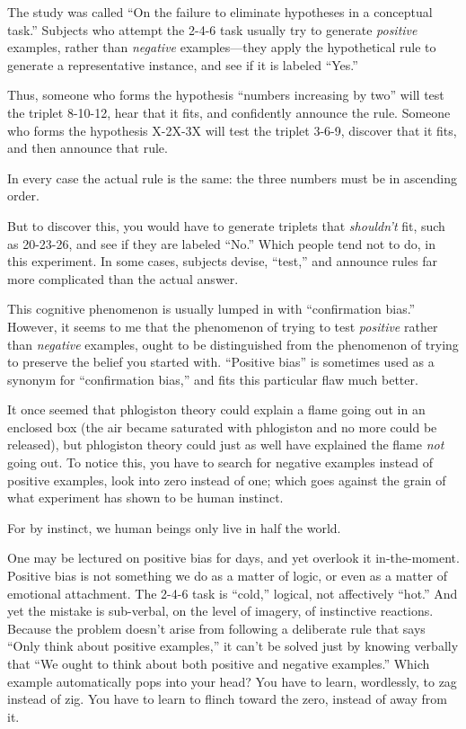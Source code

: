 {
 The study was called ``On the failure to
eliminate hypotheses in a conceptual task.'' Subjects
who attempt the 2-4-6 task usually try to generate \textit{positive}
examples, rather than \textit{negative} examples---they apply the
hypothetical rule to generate a representative instance, and see if it
is labeled ``Yes.''}

{
 Thus, someone who forms the hypothesis ``numbers
increasing by two'' will test the triplet 8-10-12,
hear that it fits, and confidently announce the rule. Someone who forms
the hypothesis X-2X-3X will test the triplet 3-6-9, discover that it
fits, and then announce that rule.}

{
 In every case the actual rule is the same: the three numbers must
be in ascending order.}

{
 But to discover this, you would have to generate triplets that
\textit{shouldn't} fit, such as 20-23-26, and see if
they are labeled ``No.'' Which
people tend not to do, in this experiment. In some cases, subjects
devise, ``test,'' and announce rules
far more complicated than the actual answer.}

{
 This cognitive phenomenon is usually lumped in with
``confirmation bias.'' However, it
seems to me that the phenomenon of trying to test \textit{positive}
rather than \textit{negative} examples, ought to be distinguished from
the phenomenon of trying to preserve the belief you started with.
``Positive bias'' is sometimes used
as a synonym for ``confirmation
bias,'' and fits this particular flaw much better.}

{
 It once seemed that phlogiston theory could explain a flame going
out in an enclosed box (the air became saturated with phlogiston and no
more could be released), but phlogiston theory could just as well have
explained the flame \textit{not} going out. To notice this, you have to
search for negative examples instead of positive examples, look into
zero instead of one; which goes against the grain of what experiment
has shown to be human instinct.}

{
 For by instinct, we human beings only live in half the world.}

{
 One may be lectured on positive bias for days, and yet overlook it
in-the-moment. Positive bias is not something we do as a matter of
logic, or even as a matter of emotional attachment. The 2-4-6 task is
``cold,'' logical, not affectively
``hot.'' And yet the mistake is
sub-verbal, on the level of imagery, of instinctive reactions. Because
the problem doesn't arise from following a deliberate
rule that says ``Only think about positive
examples,'' it can't be solved just
by knowing verbally that ``We ought to think about
both positive and negative examples.'' Which example
automatically pops into your head? You have to learn, wordlessly, to
zag instead of zig. You have to learn to flinch toward the zero,
instead of away from it.}

